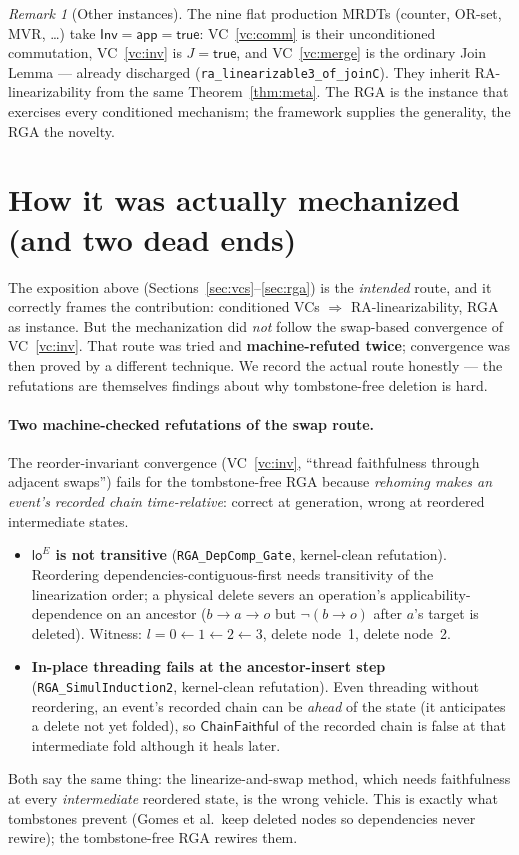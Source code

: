 \documentclass[11pt]{article}
\theoremstyle{definition}
\theoremstyle{remark}
\newtheorem{remark}{Remark}
\newcommand{\loE}{\mathsf{lo}^{E}}
\newcommand{\Inv}{\mathsf{Inv}}
\newcommand{\app}{\mathsf{app}}
\newcommand{\ChainFaithful}{\textsf{ChainFaithful}}
\newcommand{\lean}[1]{\texttt{#1}}
\begin{document}
\begin{remark}[Other instances]
The nine flat production MRDTs (counter, OR-set, MVR, \dots) take $\Inv=\app=\mathsf{true}$:
VC~\ref{vc:comm} is their unconditioned commutation, VC~\ref{vc:inv} is $J=\mathsf{true}$,
and VC~\ref{vc:merge} is the ordinary Join Lemma --- already discharged
(\lean{ra\_linearizable3\_of\_joinC}). They inherit RA-linearizability from the same
Theorem~\ref{thm:meta}. The RGA is the instance that exercises every conditioned mechanism;
the framework supplies the generality, the RGA the novelty.
\end{remark}

\section{How it was actually mechanized (and two dead ends)}\label{sec:actual}

The exposition above (Sections~\ref{sec:vcs}--\ref{sec:rga}) is the \emph{intended} route, and it
correctly frames the contribution: conditioned VCs $\Rightarrow$ RA-linearizability, RGA as
instance. But the mechanization did \emph{not} follow the swap-based convergence of
VC~\ref{vc:inv}. That route was tried and \textbf{machine-refuted twice}; convergence was then
proved by a different technique. We record the actual route honestly --- the refutations are
themselves findings about why tombstone-free deletion is hard.

\paragraph{Two machine-checked refutations of the swap route.} The reorder-invariant convergence
(VC~\ref{vc:inv}, ``thread faithfulness through adjacent swaps'') fails for the tombstone-free
RGA because \emph{rehoming makes an event's recorded chain time-relative}: correct at generation,
wrong at reordered intermediate states.
\begin{itemize}[nosep]
  \item \textbf{$\loE$ is not transitive} (\lean{RGA\_DepComp\_Gate}, kernel-clean refutation).
  Reordering dependencies-contiguous-first needs transitivity of the linearization order; a
  physical delete severs an operation's applicability-dependence on an ancestor
  ($b\!\to\!a\!\to\!o$ but $\neg(b\!\to\!o)$ after $a$'s target is deleted). Witness:
  $l=0\!\leftarrow\!1\!\leftarrow\!2\!\leftarrow\!3$, delete node~1, delete node~2.
  \item \textbf{In-place threading fails at the ancestor-insert step}
  (\lean{RGA\_SimulInduction2}, kernel-clean refutation). Even threading without reordering, an
  event's recorded chain can be \emph{ahead} of the state (it anticipates a delete not yet folded),
  so $\ChainFaithful$ of the recorded chain is false at that intermediate fold although it heals
  later.
\end{itemize}
Both say the same thing: the linearize-and-swap method, which needs faithfulness at every
\emph{intermediate} reordered state, is the wrong vehicle. This is exactly what tombstones prevent
(Gomes et al.\ keep deleted nodes so dependencies never rewire); the tombstone-free RGA rewires
them.
\end{document}
